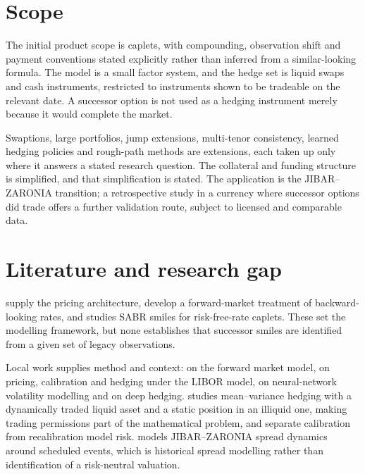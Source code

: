 \documentclass[12pt,final]{article}
\begin{document}
	\section{Scope}

	The initial product scope is caplets, with compounding, observation shift and
	payment conventions stated explicitly rather than inferred from a
	similar-looking formula. The model is a small factor system, and the hedge
	set is liquid swaps and cash instruments, restricted to instruments shown to
	be tradeable on the relevant date. A successor option is not used as a
	hedging instrument merely because it would complete the market.

	Swaptions, large portfolios, jump extensions, multi-tenor consistency,
	learned hedging policies and rough-path methods are extensions, each taken up
	only where it answers a stated research question. The collateral and funding
	structure is simplified, and that simplification is stated. The application is
	the JIBAR--ZARONIA transition; a retrospective study in a currency where
	successor options did trade offers a further validation route, subject to
	licensed and comparable data.

	\section{Literature and research gap}

	\citet{brigo2006} supply the pricing architecture, \citet{lyashenko2019}
	develop a forward-market treatment of backward-looking rates, and
	\citet{willems2020} studies SABR smiles for risk-free-rate caplets. These set
	the modelling framework, but none establishes that successor smiles are
	identified from a given set of legacy observations.

	Local work supplies method and context: \citet{konaite2024} on the forward
	market model, \citet{menziwa2023} on pricing, calibration and hedging under
	the LIBOR model, \citet{robbertze2021} on neural-network volatility modelling
	and \citet{stangroom2023} on deep hedging. \citet{mavuso2014} studies
	mean--variance hedging with a dynamically traded liquid asset and a static
	position in an illiquid one, making trading permissions part of the
	mathematical problem, and \citet{feng2018} separate calibration from
	recalibration model risk. \citet{alfeus2026} models JIBAR--ZARONIA spread
	dynamics around scheduled events, which is historical spread modelling rather
	than identification of a risk-neutral valuation.
\end{document}
